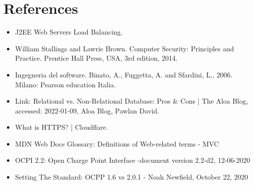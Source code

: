 \documentclass[12pt]{report}
\begin{document}
\chapter{References}
\begin{itemize}
    \item J2EE Web Servers Load Balancing.
    \item William Stallings and Lawrie Brown. Computer Security: Principles and Practice. Prentice Hall Press, USA, 3rd edition, 2014.
    \item Ingegneria del software. Binato, A., Fuggetta, A. and Sfardini, L., 2006. Milano: Pearson education Italia.
    \item Link: Relational vs. Non-Relational Database: Pros \& Cons | The Aloa Blog, accessed: 2022-01-09, Aloa Blog, Pawlan David.
    \item What is HTTPS? | Cloudflare.
    \item MDN Web Docs Glossary: Definitions of Web-related terms - MVC
    \item OCPI 2.2: Open Charge Point Interface -document version 2.2-d2, 12-06-2020
    \item Setting The Standard: OCPP 1.6 vs 2.0.1 - Noah Newfield, October 22, 2020
\end{itemize}  
\end{document}
